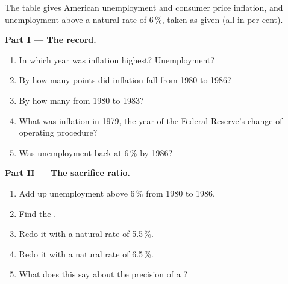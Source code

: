 \begin{problem}
\label{pb:g12:phillips-curve:1}
The table gives American unemployment and consumer price inflation, and unemployment above a natural rate of 6\,\%, taken as given (all in per cent).

\medskip
\begin{center}
\small
{}
\end{center}

\medskip
\noindent\textbf{Part I --- The record.}
\begin{enumerate}
\item In which year was inflation highest? Unemployment?
\item By how many points did inflation fall from 1980 to 1986?
\item By how many from 1980 to 1983?
\item What was inflation in 1979, the year of the Federal Reserve's change of operating procedure?
\item Was unemployment back at 6\,\% by 1986?
\end{enumerate}

\medskip
\noindent\textbf{Part II --- The sacrifice ratio.}
\begin{enumerate}[resume]
\item Add up unemployment above 6\,\% from 1980 to 1986.
\item Find the .
\item Redo it with a natural rate of 5.5\,\%.
\item Redo it with a natural rate of 6.5\,\%.
\item What does this say about the precision of a ?
\end{enumerate}


\end{problem}
